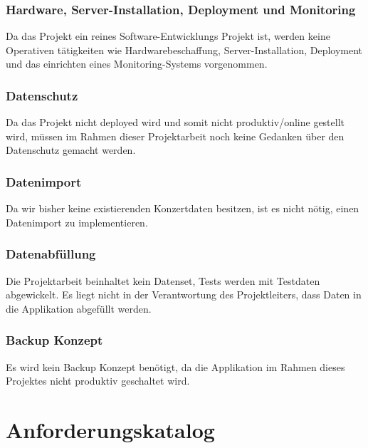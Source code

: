 \subsubsection{Hardware, Server-Installation, Deployment und
  Monitoring}\label{hardware-server-installation-deployment-und-monitoring}

Da das Projekt ein reines Software-Entwicklungs Projekt ist, werden
keine Operativen tätigkeiten wie Hardwarebeschaffung,
Server-Installation, Deployment und das einrichten eines
Monitoring-Systems vorgenommen.

\subsubsection{Datenschutz}\label{datenschutz}

Da das Projekt nicht deployed wird und somit nicht produktiv/online
gestellt wird, müssen im Rahmen dieser Projektarbeit noch keine Gedanken
über den Datenschutz gemacht werden.

\subsubsection{Datenimport}\label{datenimport}

Da wir bisher keine existierenden Konzertdaten besitzen, ist es nicht
nötig, einen Datenimport zu implementieren.

\subsubsection{Datenabfüllung}\label{datenabfuxfcllung}

Die Projektarbeit beinhaltet kein Datenset, Tests werden mit Testdaten
abgewickelt. Es liegt nicht in der Verantwortung des Projektleiters,
dass Daten in die Applikation abgefüllt werden.

\subsubsection{Backup Konzept}\label{backup-konzept}

Es wird kein Backup Konzept benötigt, da die Applikation im Rahmen
dieses Projektes nicht produktiv geschaltet wird.

\clearpage
\section{Anforderungskatalog}\label{anforderungskatalog}

